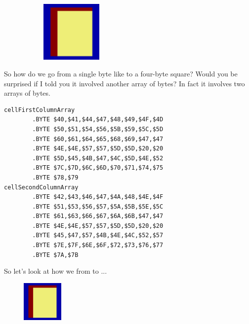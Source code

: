 \begin{figure}[H]
{\begin{adjustbox}{width=15cm,center}
\begin{subfigure}{0.3\textwidth}
        \caption{}
      \end{subfigure}
      \begin{subfigure}{0.3\textwidth}
        \includegraphics[width=3cm]{src/bonusphase/row21_cell4.png}%
        \caption{}
      \end{subfigure}
    \end{adjustbox}
  }
\end{figure}
\captionsetup[subfigure]{font=footnotesize,labelfont=footnotesize,labelformat=empty}

So how do we go from a single byte like  to a four-byte square? Would you be surprised
if I told you it involved another array of bytes? In fact it involves two arrays of bytes.

\begin{lstlisting}
cellFirstColumnArray
        .BYTE $40,$41,$44,$47,$48,$49,$4F,$4D
        .BYTE $50,$51,$54,$56,$5B,$59,$5C,$5D
        .BYTE $60,$61,$64,$65,$68,$69,$47,$47
        .BYTE $4E,$4E,$57,$57,$5D,$5D,$20,$20
        .BYTE $5D,$45,$4B,$47,$4C,$5D,$4E,$52
        .BYTE $7C,$7D,$6C,$6D,$70,$71,$74,$75
        .BYTE $78,$79
cellSecondColumnArray   
        .BYTE $42,$43,$46,$47,$4A,$48,$4E,$4F
        .BYTE $51,$53,$56,$57,$5A,$5B,$5E,$5C
        .BYTE $61,$63,$66,$67,$6A,$6B,$47,$47
        .BYTE $4E,$4E,$57,$57,$5D,$5D,$20,$20
        .BYTE $45,$47,$57,$4B,$4E,$4C,$52,$57
        .BYTE $7E,$7F,$6E,$6F,$72,$73,$76,$77
        .BYTE $7A,$7B
\end{lstlisting}


So let's look at how we from  to ...

\begin{figure}[H]
  {
    \begin{adjustbox}{width=2cm,center}
        \includegraphics[width=2cm]{src/bonusphase/row21_cell0.png}%
    \end{adjustbox}
  }
\end{figure}

